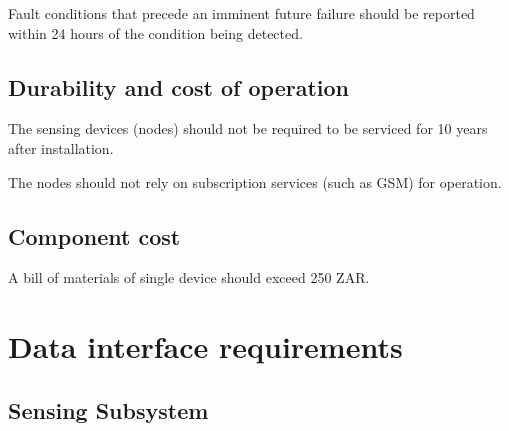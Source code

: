 \documentclass[12pt]{article}
\begin{document}
Fault conditions that  precede an imminent future failure should be reported within 24 hours of the condition being
detected.

\subsection{Durability and cost of operation}
The sensing devices (nodes) should not be required to be serviced for 10 years after installation.

The nodes should not rely on subscription services (such as GSM) for operation.

\subsection{Component cost}
A bill of materials of single device should exceed 250 ZAR.

\newpage
\section{Data interface requirements}
\subsection{Sensing Subsystem} 
\end{document}
